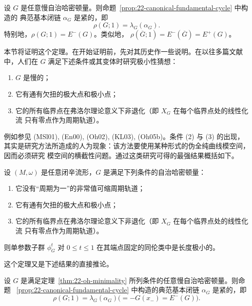 \begin{theorem}
\label{thm:22-slow-fundamental-cycle-tight}
设 $G$ 是任意慢自治哈密顿量。则命题~\ref{prop:22-canonical-fundamental-cycle} 中构造的
典范基本闭链 $\alpha_G$ 是紧的，即
\[
 \rho(G;1)=\lambda_G(\alpha_G).
\]
特别地，$\rho(G;1)=E^-(G)$。类似地，
$\rho(\overline G;1)=E^-(\overline G)=E^+(G)$。
\end{theorem}

本节将证明这个定理。在开始证明前，先对其历史作一些说明。在以往多篇文献中，人们在
$G$ 满足下述条件或其变体时研究极小性猜想：
\begin{enumerate}
 \item $G$ 是慢的；
 \item 它有通有欠扭的极大点和极小点；
 \item 它的所有临界点在弗洛尔理论意义下非退化（即 $X_G$ 在每个临界点处的线性化流
 只有零点作为周期轨道）。
\end{enumerate}
例如参见 (MSl01), (En00), (Oh02), (KL03), (Oh05b)。条件 (2) 与 (3) 的出现，
其实是研究方法所造成的人为现象：该方法要使用某种形式的伪全纯曲线模空间，因而必须研究
模空间的横截性问题。通过这类研究可得的最强结果概括如下。

\begin{theorem}[定理 (Oh05b)]
\label{thm:22-oh-minimality}
设 $(M,\omega)$ 是任意闭辛流形，$G$ 是满足下列条件的自治哈密顿量：
\begin{enumerate}
 \item 它没有“周期为一”的非常值可缩周期轨道；
 \item 它有通有欠扭的极大点和极小点；
 \item 它的所有临界点在弗洛尔理论意义下非退化（即 $X_G$ 在每个临界点处的线性化流
 只有零点作为周期轨道）。
\end{enumerate}
则单参数子群 $\phi_G^t$ 对 $0\leq t\leq1$ 在其端点固定的同伦类中是长度极小的。
\end{theorem}

这个定理又是下述结果的直接推论。

\begin{theorem}
\label{thm:22-tight-under-twisted-cycle}
设 $G$ 是满足定理~\ref{thm:22-oh-minimality} 所列条件的任意慢自治哈密顿量。则命题
~\ref{prop:22-canonical-fundamental-cycle} 中构造的典范基本闭链 $\alpha_G$ 是紧的，即
\[
 \rho(G;1)=\lambda_G(\alpha_G)
 \bigl(=-G(x_-)=E^-(G)\bigr).
\]
\end{theorem}

